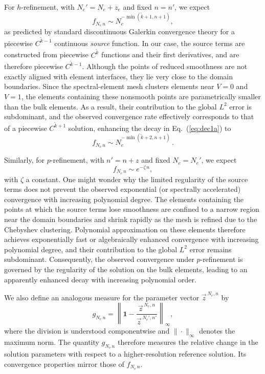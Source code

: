 \documentclass[prl,twocolumn,superscriptaddress,nofootinbib]{revtex4-2}
\begin{document}
For $h$-refinement, with $N_e' = N_e + z_e$ and fixed $n = n'$, we expect
\begin{equation}
f_{N_e\,n} \sim N_e^{-\min(\tilde{k}+1,n+1)},
\label{eq:dec1a}
\end{equation}
as predicted by standard discontinuous Galerkin convergence theory
\cite{Cockburn:2001,Cockburn:2000,Hesthaven:2008,Riviere:2008}
for a piecewise $C^{\tilde{k}-1}$ continuous \emph{source} function. In our case, the source terms are constructed from piecewise $C^{\tilde{k}}$ functions and their first derivatives, and are therefore piecewise $C^{\tilde{k}-1}$. Although the points of reduced smoothness are not exactly aligned with element interfaces, they lie very close to the domain boundaries. Since the spectral-element mesh clusters elements near $V=0$ and $V=1$, the elements containing these nonsmooth points are parametrically smaller than the bulk elements. As a result, their contribution to the global $L^2$ error is subdominant, and the observed convergence rate effectively corresponds to that of a piecewise $C^{\tilde{k}+1}$ solution, enhancing the decay in Eq.~(\ref{eq:dec1a}) to
\begin{equation}
f_{N_e\,n} \sim N_e^{-\min(\tilde{k}+2,n+1)}\,.
\label{eq:dec1}
\end{equation}

Similarly, for $p$-refinement, with $n' = n + z$ and fixed $N_e = N_e'$, we expect
\begin{equation}
f_{N_e\,n} \sim e^{-\zeta\,n},
\label{eq:dec2}
\end{equation}
with $\zeta$ a constant. One might wonder why the limited regularity of the source terms does not prevent the observed exponential (or spectrally accelerated) convergence with increasing polynomial degree. The elements containing the points at which the source terms lose smoothness are confined to a narrow region near the domain boundaries and shrink rapidly as the mesh is refined due to the Chebyshev clustering. Polynomial approximation on these elements therefore achieves exponentially fast or algebraically enhanced convergence with increasing polynomial degree, and their contribution to the global $L^2$ error remains subdominant. Consequently, the observed convergence under $p$-refinement is governed by the regularity of the solution on the bulk elements, leading to an apparently enhanced decay with increasing polynomial order.

We also define an analogous measure for the parameter vector $\vec{z}^{\,N_e,n}$ by
\begin{equation}
g_{N_e\,n}
=\left\|\mathbf{1}
-\frac{\vec{z}^{\,N_e,n}}{\vec{z}^{\,N_e',n'}}\right\|_{\infty},
\end{equation}
where the division is understood componentwise and $\|\cdot\|_\infty$ denotes the maximum norm. The quantity $g_{N_e\,n}$ therefore measures the relative change in the solution parameters with respect to a higher-resolution reference solution. Its convergence properties mirror those of $f_{N_e\,n}$.
\end{document}
